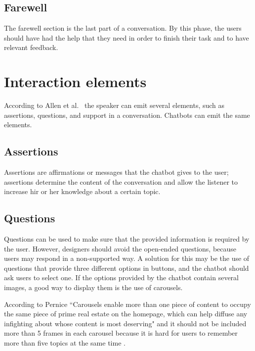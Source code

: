 \documentclass[a4paper,10pt]{article}
\begin{document}
\subsection{Farewell}
The farewell section is the last part of a conversation. By this phase, the users should have had the help that they need in order to finish their task and to have relevant feedback.  


\section{Interaction elements}
According to Allen et al.~\cite{allen1978conversation} the speaker can emit several elements, such as assertions, questions, and support in a conversation. Chatbots can emit the same elements. 

\subsection{Assertions}
Assertions are affirmations or messages that the chatbot gives to the user; assertions determine the content of the conversation and allow the listener to increase hir or her knowledge about a certain topic. 

\subsection{Questions}
Questions can be used to make sure that the provided information is required by the user. However, designers should avoid the open-ended questions, because users may respond in a non-supported way. A solution for this may be the use of questions that provide three different options in buttons, and the chatbot should ask users to select one. If the options provided by the chatbot contain several images, a good way to display them is the use of carousels. 

According to Pernice ``Carousels enable more than one piece of content to occupy the same piece of prime real estate on the homepage, which can help diffuse any infighting about whose content is most deserving" and it should not be included more than 5 frames in each carousel because it is hard for users to remember more than five topics at the same time \cite{carousel}. 

\end{document}
